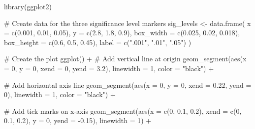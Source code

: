 \documentclass[
  letterpaper,
  DIV=11,
  numbers=noendperiod]{scrreprt}
\newenvironment{Shaded}{\begin{snugshade}}{\end{snugshade}}
\newcommand{\AttributeTok}[1]{\textcolor[rgb]{0.40,0.45,0.13}{#1}}
\newcommand{\CommentTok}[1]{\textcolor[rgb]{0.37,0.37,0.37}{#1}}
\newcommand{\DecValTok}[1]{\textcolor[rgb]{0.68,0.00,0.00}{#1}}
\newcommand{\FloatTok}[1]{\textcolor[rgb]{0.68,0.00,0.00}{#1}}
\newcommand{\FunctionTok}[1]{\textcolor[rgb]{0.28,0.35,0.67}{#1}}
\newcommand{\NormalTok}[1]{\textcolor[rgb]{0.00,0.23,0.31}{#1}}
\newcommand{\OtherTok}[1]{\textcolor[rgb]{0.00,0.23,0.31}{#1}}
\newcommand{\SpecialCharTok}[1]{\textcolor[rgb]{0.37,0.37,0.37}{#1}}
\newcommand{\StringTok}[1]{\textcolor[rgb]{0.13,0.47,0.30}{#1}}
\begin{document}
\begin{Shaded}
\begin{Highlighting}[]
\FunctionTok{library}\NormalTok{(ggplot2)}

\CommentTok{\# Create data for the three significance level markers}
\NormalTok{sig\_levels }\OtherTok{\textless{}{-}} \FunctionTok{data.frame}\NormalTok{(}
  \AttributeTok{x =} \FunctionTok{c}\NormalTok{(}\FloatTok{0.001}\NormalTok{, }\FloatTok{0.01}\NormalTok{, }\FloatTok{0.05}\NormalTok{),}
  \AttributeTok{y =} \FunctionTok{c}\NormalTok{(}\FloatTok{2.8}\NormalTok{, }\FloatTok{1.8}\NormalTok{, }\FloatTok{0.9}\NormalTok{),}
  \AttributeTok{box\_width =} \FunctionTok{c}\NormalTok{(}\FloatTok{0.025}\NormalTok{, }\FloatTok{0.02}\NormalTok{, }\FloatTok{0.018}\NormalTok{),}
  \AttributeTok{box\_height =} \FunctionTok{c}\NormalTok{(}\FloatTok{0.6}\NormalTok{, }\FloatTok{0.5}\NormalTok{, }\FloatTok{0.45}\NormalTok{),}
  \AttributeTok{label =} \FunctionTok{c}\NormalTok{(}\StringTok{".001"}\NormalTok{, }\StringTok{".01"}\NormalTok{, }\StringTok{".05"}\NormalTok{)}
\NormalTok{)}

\CommentTok{\# Create the plot}
\FunctionTok{ggplot}\NormalTok{() }\SpecialCharTok{+}
  \CommentTok{\# Add vertical line at origin}
  \FunctionTok{geom\_segment}\NormalTok{(}\FunctionTok{aes}\NormalTok{(}\AttributeTok{x =} \DecValTok{0}\NormalTok{, }\AttributeTok{y =} \DecValTok{0}\NormalTok{, }\AttributeTok{xend =} \DecValTok{0}\NormalTok{, }\AttributeTok{yend =} \FloatTok{3.2}\NormalTok{),}
               \AttributeTok{linewidth =} \DecValTok{1}\NormalTok{, }\AttributeTok{color =} \StringTok{"black"}\NormalTok{) }\SpecialCharTok{+}
  
  \CommentTok{\# Add horizontal axis line}
  \FunctionTok{geom\_segment}\NormalTok{(}\FunctionTok{aes}\NormalTok{(}\AttributeTok{x =} \DecValTok{0}\NormalTok{, }\AttributeTok{y =} \DecValTok{0}\NormalTok{, }\AttributeTok{xend =} \FloatTok{0.22}\NormalTok{, }\AttributeTok{yend =} \DecValTok{0}\NormalTok{),}
               \AttributeTok{linewidth =} \DecValTok{1}\NormalTok{, }\AttributeTok{color =} \StringTok{"black"}\NormalTok{) }\SpecialCharTok{+}
  
  \CommentTok{\# Add tick marks on x{-}axis}
  \FunctionTok{geom\_segment}\NormalTok{(}\FunctionTok{aes}\NormalTok{(}\AttributeTok{x =} \FunctionTok{c}\NormalTok{(}\DecValTok{0}\NormalTok{, }\FloatTok{0.1}\NormalTok{, }\FloatTok{0.2}\NormalTok{), }\AttributeTok{xend =} \FunctionTok{c}\NormalTok{(}\DecValTok{0}\NormalTok{, }\FloatTok{0.1}\NormalTok{, }\FloatTok{0.2}\NormalTok{),}
                   \AttributeTok{y =} \DecValTok{0}\NormalTok{, }\AttributeTok{yend =} \SpecialCharTok{{-}}\FloatTok{0.15}\NormalTok{),}
               \AttributeTok{linewidth =} \DecValTok{1}\NormalTok{) }\SpecialCharTok{+}
  

\end{Highlighting}
\end{Shaded}
\end{document}
